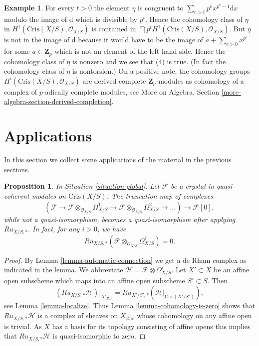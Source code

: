 \documentclass{stacks-project}
\theoremstyle{plain}
\newtheorem{proposition}[subsection]{Proposition}
\theoremstyle{definition}
\newtheorem{example}[subsection]{Example}
\theoremstyle{remark}
\numberwithin{equation}{subsection}
\begin{document}
\begin{example}
For every $t > 0$ the element $\eta$ is congruent to
$\sum_{e > t} p^e x^{p^e - 1}\text{d}x$ modulo the image of
$\text{d}$ which is divisible by $p^t$. Hence the cohomology
class of $\eta$ in $H^1(\text{Cris}(X/S), \mathcal{O}_{X/S})$
is contained in $\bigcap p^tH^1(\text{Cris}(X/S), \mathcal{O}_{X/S})$.
But $\eta$ is not in the image of $\text{d}$ because it would have
to be the image of $a + \sum_{e > 0} x^{p^e}$ for some $a \in \mathbf{Z}_p$
which is not an element of the left hand side.
Hence the cohomology class of $\eta$ is nonzero and we see that
(4) is true. (In fact the cohomology class of $\eta$ is nontorsion.)
On a positive note, the cohomology groups
$H^i(\text{Cris}(X/S), \mathcal{O}_{X/S})$
are derived complete $\mathbf{Z}_p$-modules as cohomology of
a complex of $p$-adically complete modules, see
More on Algebra, Section \ref{more-algebra-section-derived-completion}.
\end{example}








\section{Applications}
\label{section-applications}

\noindent
In this section we collect some applications of the material in
the previous sections.

\begin{proposition}
\label{proposition-compare-with-de-Rham}
In Situation \ref{situation-global}.
Let $\mathcal{F}$ be a crystal in quasi-coherent modules on
$\text{Cris}(X/S)$. The truncation map of complexes
$$
(\mathcal{F} \to
\mathcal{F} \otimes_{\mathcal{O}_{X/S}} \Omega^1_{X/S} \to
\mathcal{F} \otimes_{\mathcal{O}_{X/S}} \Omega^2_{X/S} \to \ldots)
\longrightarrow \mathcal{F}[0],
$$
while not a quasi-isomorphism, becomes a quasi-isomorphism after applying
$Ru_{X/S, *}$. In fact, for any $i > 0$, we have 
$$
Ru_{X/S, *}(\mathcal{F} \otimes_{\mathcal{O}_{X/S}} \Omega^i_{X/S}) = 0.
$$
\end{proposition}

\begin{proof}
By Lemma \ref{lemma-automatic-connection} we get a de Rham complex
as indicated in the lemma. We abbreviate
$\mathcal{H} = \mathcal{F} \otimes \Omega^i_{X/S}$.
Let $X' \subset X$ be an affine open
subscheme which maps into an affine open subscheme $S' \subset S$.
Then
$$
(Ru_{X/S, *}\mathcal{H})|_{X'_{Zar}} =
Ru_{X'/S', *}(\mathcal{H}|_{\text{Cris}(X'/S')}),
$$
see Lemma \ref{lemma-localize}. Thus
Lemma \ref{lemma-cohomology-is-zero}
shows that $Ru_{X/S, *}\mathcal{H}$ is a complex of sheaves on
$X_{Zar}$ whose cohomology on any affine open is trivial.
As $X$ has a basis for its topology consisting of affine opens
this implies that $Ru_{X/S, *}\mathcal{H}$ is quasi-isomorphic to zero.
\end{proof}
\end{document}
